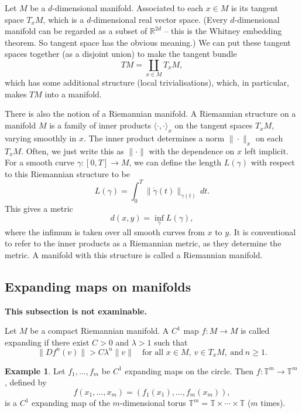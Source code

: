 \documentclass[12pt]{article}
\theoremstyle{definition}
\newtheorem{example}[theorem]{Example}
\theoremstyle{remark}
\begin{document}
Let $M$ be a $d$-dimensional manifold.
Associated to each $x \in M$ is its tangent space $T_xM$, which is a $d$-dimensional
real vector space. (Every $d$-dimensional manifold can be regarded as a subset of $\mathbb R^{2d}$
-- this is the Whitney embedding theorem. So tangent space has the obvious meaning.)
We can put these tangent spaces together (as a disjoint union) to make the tangent bundle
\[
TM = \coprod_{x \in M} T_xM,
\]
which has some additional structure (local trivialisations), which, in particular, makes
$TM$ into a manifold.

There is also the notion of a Riemannian manifold. 
A Riemannian structure on a manifold $M$ is a family of inner products
$\langle \cdot,\cdot \rangle_x$ on the tangent spaces $T_xM$, varying smoothly in $x$.
The inner product determines a norm $\|\cdot\|_x$ on each $T_xM$.
Often, we just write this as $\|\cdot\|$ with the dependence on $x$ left implicit.
For a smooth curve 
$\gamma : [0,T] \to M$, we can define the length $L(\gamma)$ with respect to this Riemannian
structure to be
\[
L(\gamma) = \int_0^T \|\dot \gamma(t)\|_{\gamma(t)} \, dt.
\]
This gives a metric 
\[
d(x,y) = \inf_\gamma L(\gamma),
\]
where the infimum is taken over all smooth curves from $x$ to $y$.
It is conventional to refer to the inner products as a Riemannian metric, as they determine the metric.
A manifold with this structure is called a Riemannian manifold.





\subsection{Expanding maps on manifolds}

\noindent
{\bf This subsection is not examinable.}


Let $M$ be a compact Riemannian manifold. A $C^1$ map $f : M \to M$ is called expanding if
there exist $C>0$ and $\lambda>1$ such that
\[
\|Df^n(v)\| >C\lambda^n \|v\| \quad \text{for all } x \in M, \ v \in T_xM, \ \text{and} \ n \ge 1.
\]




\begin{example}
Let $f_1,\ldots, f_m$ be $C^1$ expanding maps on the circle. Then $f : \mathbb T^m \to \mathbb T^m$, defined by
\[
f(x_1,\ldots,x_m) = (f_1(x_1),\ldots,f_m(x_m)),
\]
is a $C^1$ expanding map of the $m$-dimensional torus $\mathbb T^m = \mathbb T \times \cdots \times \mathbb T$ ($m$ times).
\end{example}
\end{document}
